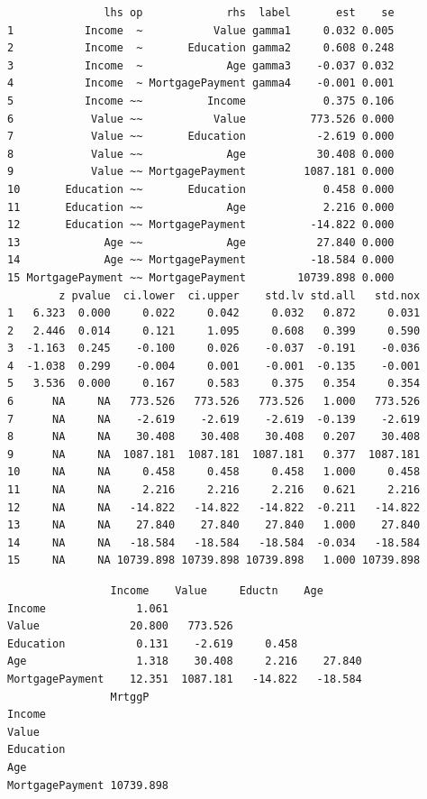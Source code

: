 \begin{verbatim}
               lhs op             rhs  label       est    se
1           Income  ~           Value gamma1     0.032 0.005
2           Income  ~       Education gamma2     0.608 0.248
3           Income  ~             Age gamma3    -0.037 0.032
4           Income  ~ MortgagePayment gamma4    -0.001 0.001
5           Income ~~          Income            0.375 0.106
6            Value ~~           Value          773.526 0.000
7            Value ~~       Education           -2.619 0.000
8            Value ~~             Age           30.408 0.000
9            Value ~~ MortgagePayment         1087.181 0.000
10       Education ~~       Education            0.458 0.000
11       Education ~~             Age            2.216 0.000
12       Education ~~ MortgagePayment          -14.822 0.000
13             Age ~~             Age           27.840 0.000
14             Age ~~ MortgagePayment          -18.584 0.000
15 MortgagePayment ~~ MortgagePayment        10739.898 0.000
        z pvalue  ci.lower  ci.upper    std.lv std.all   std.nox
1   6.323  0.000     0.022     0.042     0.032   0.872     0.031
2   2.446  0.014     0.121     1.095     0.608   0.399     0.590
3  -1.163  0.245    -0.100     0.026    -0.037  -0.191    -0.036
4  -1.038  0.299    -0.004     0.001    -0.001  -0.135    -0.001
5   3.536  0.000     0.167     0.583     0.375   0.354     0.354
6      NA     NA   773.526   773.526   773.526   1.000   773.526
7      NA     NA    -2.619    -2.619    -2.619  -0.139    -2.619
8      NA     NA    30.408    30.408    30.408   0.207    30.408
9      NA     NA  1087.181  1087.181  1087.181   0.377  1087.181
10     NA     NA     0.458     0.458     0.458   1.000     0.458
11     NA     NA     2.216     2.216     2.216   0.621     2.216
12     NA     NA   -14.822   -14.822   -14.822  -0.211   -14.822
13     NA     NA    27.840    27.840    27.840   1.000    27.840
14     NA     NA   -18.584   -18.584   -18.584  -0.034   -18.584
15     NA     NA 10739.898 10739.898 10739.898   1.000 10739.898
\end{verbatim}

\begin{Shaded}
\begin{Highlighting}[]
\OperatorTok{$}
\end{Highlighting}
\end{Shaded}

\begin{verbatim}
                Income    Value     Eductn    Age      
Income              1.061                              
Value              20.800   773.526                    
Education           0.131    -2.619     0.458          
Age                 1.318    30.408     2.216    27.840
MortgagePayment    12.351  1087.181   -14.822   -18.584
                MrtggP   
Income                   
Value                    
Education                
Age                      
MortgagePayment 10739.898
\end{verbatim}

